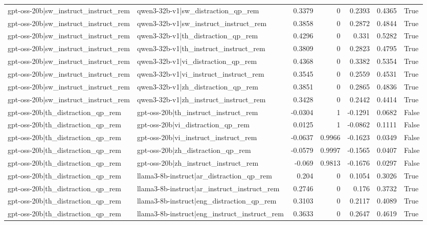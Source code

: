 \begin{table}
\begin{tabular}{l l r r r r l}
gpt-oss-20b|sw_instruct_instruct_rem & qwen3-32b-v1|sw_distraction_qp_rem & 0.3379 & 0 & 0.2393 & 0.4365 & True \\
gpt-oss-20b|sw_instruct_instruct_rem & qwen3-32b-v1|sw_instruct_instruct_rem & 0.3858 & 0 & 0.2872 & 0.4844 & True \\
gpt-oss-20b|sw_instruct_instruct_rem & qwen3-32b-v1|th_distraction_qp_rem & 0.4296 & 0 & 0.331 & 0.5282 & True \\
gpt-oss-20b|sw_instruct_instruct_rem & qwen3-32b-v1|th_instruct_instruct_rem & 0.3809 & 0 & 0.2823 & 0.4795 & True \\
gpt-oss-20b|sw_instruct_instruct_rem & qwen3-32b-v1|vi_distraction_qp_rem & 0.4368 & 0 & 0.3382 & 0.5354 & True \\
gpt-oss-20b|sw_instruct_instruct_rem & qwen3-32b-v1|vi_instruct_instruct_rem & 0.3545 & 0 & 0.2559 & 0.4531 & True \\
gpt-oss-20b|sw_instruct_instruct_rem & qwen3-32b-v1|zh_distraction_qp_rem & 0.3851 & 0 & 0.2865 & 0.4836 & True \\
gpt-oss-20b|sw_instruct_instruct_rem & qwen3-32b-v1|zh_instruct_instruct_rem & 0.3428 & 0 & 0.2442 & 0.4414 & True \\
gpt-oss-20b|th_distraction_qp_rem & gpt-oss-20b|th_instruct_instruct_rem & -0.0304 & 1 & -0.1291 & 0.0682 & False \\
gpt-oss-20b|th_distraction_qp_rem & gpt-oss-20b|vi_distraction_qp_rem & 0.0125 & 1 & -0.0862 & 0.1111 & False \\
gpt-oss-20b|th_distraction_qp_rem & gpt-oss-20b|vi_instruct_instruct_rem & -0.0637 & 0.9966 & -0.1623 & 0.0349 & False \\
gpt-oss-20b|th_distraction_qp_rem & gpt-oss-20b|zh_distraction_qp_rem & -0.0579 & 0.9997 & -0.1565 & 0.0407 & False \\
gpt-oss-20b|th_distraction_qp_rem & gpt-oss-20b|zh_instruct_instruct_rem & -0.069 & 0.9813 & -0.1676 & 0.0297 & False \\
gpt-oss-20b|th_distraction_qp_rem & llama3-8b-instruct|ar_distraction_qp_rem & 0.204 & 0 & 0.1054 & 0.3026 & True \\
gpt-oss-20b|th_distraction_qp_rem & llama3-8b-instruct|ar_instruct_instruct_rem & 0.2746 & 0 & 0.176 & 0.3732 & True \\
gpt-oss-20b|th_distraction_qp_rem & llama3-8b-instruct|eng_distraction_qp_rem & 0.3103 & 0 & 0.2117 & 0.4089 & True \\
gpt-oss-20b|th_distraction_qp_rem & llama3-8b-instruct|eng_instruct_instruct_rem & 0.3633 & 0 & 0.2647 & 0.4619 & True \\

\end{tabular}
\end{table}
